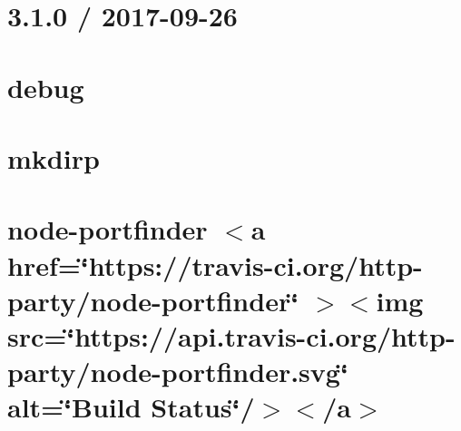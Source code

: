 \documentclass[twoside]{book}
\newcommand{\+}{\discretionary{\mbox{\scriptsize$\hookleftarrow$}}{}{}}
\begin{document}
\chapter{3.1.0 / 2017-\/09-\/26}
\label{md__c___users_vaishnavi_jadhav__desktop__developer_code_mean_stack_example_client_node_modules_p330ecd38ddaa85c9d53265574cd9eb38}

\chapter{debug}
\label{md__c___users_vaishnavi_jadhav__desktop__developer_code_mean_stack_example_client_node_modules_pbc8836a7cfbc6e0d2096b06407b4b173}

\chapter{mkdirp}
\label{md__c___users_vaishnavi_jadhav__desktop__developer_code_mean_stack_example_client_node_modules_p3648b99ffeedd03225e0cc022e597831}

\chapter{node-\/portfinder \texorpdfstring{$<$}{<}a href=\char`\"{}https\+://travis-\/ci.\+org/http-\/party/node-\/portfinder\char`\"{} \texorpdfstring{$>$}{>}\texorpdfstring{$<$}{<}img src=\char`\"{}https\+://api.\+travis-\/ci.\+org/http-\/party/node-\/portfinder.\+svg\char`\"{} alt=\char`\"{}\+Build Status\char`\"{}/\texorpdfstring{$>$}{>}\texorpdfstring{$<$}{<}/a\texorpdfstring{$>$}{>}}
\label{md__c___users_vaishnavi_jadhav__desktop__developer_code_mean_stack_example_client_node_modules_portfinder__r_e_a_d_m_e}

\end{document}
